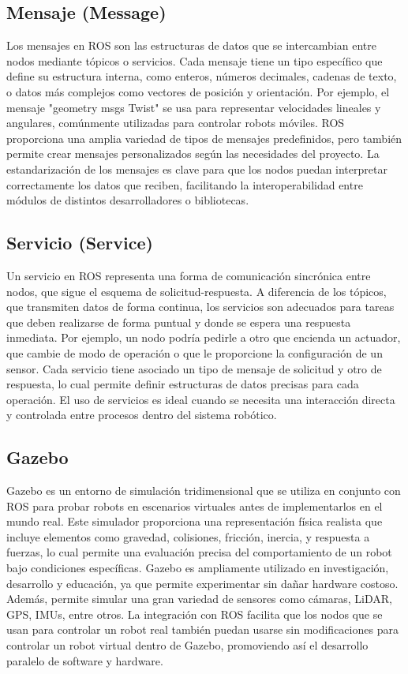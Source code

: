 \subsection{Mensaje (Message)}
Los mensajes en ROS son las estructuras de datos que se intercambian entre nodos mediante tópicos o servicios. Cada mensaje tiene un tipo específico que define su estructura interna, como enteros, números decimales, cadenas de texto, o datos más complejos como vectores de posición y orientación. Por ejemplo, el mensaje "geometry msgs Twist" se usa para representar velocidades lineales y angulares, comúnmente utilizadas para controlar robots móviles. ROS proporciona una amplia variedad de tipos de mensajes predefinidos, pero también permite crear mensajes personalizados según las necesidades del proyecto. La estandarización de los mensajes es clave para que los nodos puedan interpretar correctamente los datos que reciben, facilitando la interoperabilidad entre módulos de distintos desarrolladores o bibliotecas. \cite{rosmessage2024}     

\subsection{Servicio (Service)}
Un servicio en ROS representa una forma de comunicación sincrónica entre nodos, que sigue el esquema de solicitud-respuesta. A diferencia de los tópicos, que transmiten datos de forma continua, los servicios son adecuados para tareas que deben realizarse de forma puntual y donde se espera una respuesta inmediata. Por ejemplo, un nodo podría pedirle a otro que encienda un actuador, que cambie de modo de operación o que le proporcione la configuración de un sensor. Cada servicio tiene asociado un tipo de mensaje de solicitud y otro de respuesta, lo cual permite definir estructuras de datos precisas para cada operación. El uso de servicios es ideal cuando se necesita una interacción directa y controlada entre procesos dentro del sistema robótico. \cite{rosservice2024}


\subsection{Gazebo}
Gazebo es un entorno de simulación tridimensional que se utiliza en conjunto con ROS para probar robots en escenarios virtuales antes de implementarlos en el mundo real. Este simulador proporciona una representación física realista que incluye elementos como gravedad, colisiones, fricción, inercia, y respuesta a fuerzas, lo cual permite una evaluación precisa del comportamiento de un robot bajo condiciones específicas. Gazebo es ampliamente utilizado en investigación, desarrollo y educación, ya que permite experimentar sin dañar hardware costoso. Además, permite simular una gran variedad de sensores como cámaras, LiDAR, GPS, IMUs, entre otros. La integración con ROS facilita que los nodos que se usan para controlar un robot real también puedan usarse sin modificaciones para controlar un robot virtual dentro de Gazebo, promoviendo así el desarrollo paralelo de software y hardware. \cite{rosgazebo2024}  

